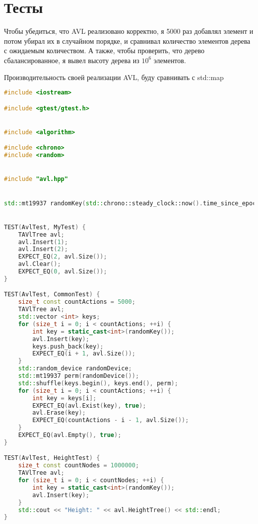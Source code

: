 \section{Тесты}

Чтобы убедиться, что AVL реализовано корректно, я 5000 раз добавлял элемент и потом убирал их в случайном порядке, и сравнивал количество элементов дерева с ожидаемым количеством.
А также, чтобы проверить, что дерево сбалансированное, я вывел высоту дерева из $10^6$ элементов.

Производительность своей реализации AVL, буду сравнивать с std::map

\begin{lstlisting}[language=C++]
#include <iostream>

#include <gtest/gtest.h>


#include <algorithm>

#include <chrono>
#include <random>


#include "avl.hpp"


std::mt19937 randomKey(std::chrono::steady_clock::now().time_since_epoch().count());


TEST(AvlTest, MyTest) {
    TAVlTree avl;
    avl.Insert(1);
    avl.Insert(2);
    EXPECT_EQ(2, avl.Size());
    avl.Clear();
    EXPECT_EQ(0, avl.Size());
}

TEST(AvlTest, CommonTest) {
    size_t const countActions = 5000;
    TAVlTree avl;
    std::vector <int> keys;
    for (size_t i = 0; i < countActions; ++i) {
        int key = static_cast<int>(randomKey());
        avl.Insert(key);
        keys.push_back(key);
        EXPECT_EQ(i + 1, avl.Size());
    }
    std::random_device randomDevice;
    std::mt19937 perm(randomDevice());
    std::shuffle(keys.begin(), keys.end(), perm);
    for (size_t i = 0; i < countActions; ++i) {
        int key = keys[i];
        EXPECT_EQ(avl.Exist(key), true);
        avl.Erase(key);
        EXPECT_EQ(countActions - i - 1, avl.Size());
    }
    EXPECT_EQ(avl.Empty(), true);
}

TEST(AvlTest, HeightTest) {
    size_t const countNodes = 1000000;
    TAVlTree avl;
    for (size_t i = 0; i < countNodes; ++i) {
        int key = static_cast<int>(randomKey());
        avl.Insert(key);
    }
    std::cout << "Height: " << avl.HeightTree() << std::endl;
}
\end{lstlisting}


